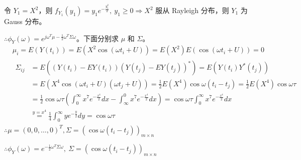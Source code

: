 令 $Y_1=X^2$，则 $f_{Y_1}(y_1)=y_1e^{-\frac{y_1^2}{2}},\ y_1\ge 0 \Rightarrow X^2$ 服从 Rayleigh 分布，则 $Y_1$ 为 Gauss 分布。

\noindent
$\therefore \phi_Y(\omega)=e^{j\omega^T\mu-\frac{1}{2}\omega^T\Sigma\omega}$。下面分别求 $\mu$ 和 $\Sigma$。
\begin{equation}\tag*{}
\begin{split}
&\mu_{i}=E(Y(t_i))=E(X^2\cos(\omega t_i+U))=E(X^2)E(\cos(\omega t_i+U))=0\\
&\begin{split}\Sigma_{ij}&=E((Y(t_i)-EY(t_i))(Y(t_j)-EY(t_j))^*)=E(Y(t_i)Y^*(t_j))\\
&=E(X^4\cos(\omega t_i+U)(\omega t_j+U))=\frac{1}{2}E(X^4)\cos\omega(t_i-t_j)=\frac{1}{2}E(X^4)\cos\omega\tau\\
&=\frac{1}{2}\cos\omega\tau\left(\int_0^\infty x^7e^{-\frac{x^4}{2}}dx-\int_\infty^0x^7e^{-\frac{x^4}{2}}dx\right)=\cos\omega\tau\int_0^\infty x^7e^{-\frac{x^4}{2}}dx\\&\overset{y=x^4}{=}\frac{1}{4}\int_0^\infty ye^{-\frac{y}{2}}dy=\cos\omega\tau\end{split}
\end{split}
\end{equation}
$\therefore \mu=(0, 0, \dots, 0)^T, \Sigma=(\cos\omega(t_i-t_j))_{m\times n}$

\noindent
$\therefore \phi_Y(\omega)=e^{-\frac{1}{2}\omega^T\Sigma\omega},\ \Sigma=(\cos\omega(t_i-t_j))_{m\times n}$